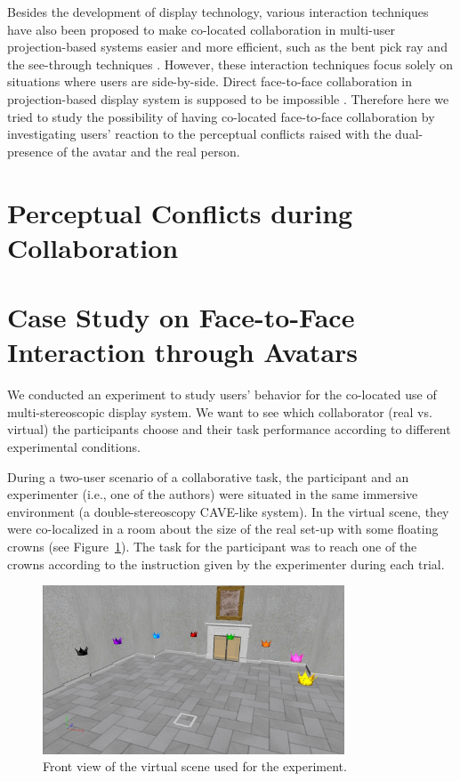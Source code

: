 Besides the development of display technology, various interaction techniques have also been proposed to make co-located collaboration in multi-user projection-based systems easier and more efficient, such as the bent pick ray \citep{Riege2006Bent} and the see-through techniques \citep{Argelaguet2010STT}. However, these interaction techniques focus solely on situations where users are side-by-side. Direct face-to-face collaboration in projection-based display system is supposed to be impossible \citep{Salzmann2009CIC}. Therefore here we tried to study the possibility of having co-located face-to-face collaboration by investigating users' reaction to the perceptual conflicts raised with the dual-presence of the avatar and the real person.


\section{Perceptual Conflicts during Collaboration}

\section{Case Study on Face-to-Face Interaction through Avatars}
We conducted an experiment to study users' behavior for the co-located use of multi-stereoscopic display system. We want to see which collaborator (real vs. virtual) the participants choose and their task performance according to different experimental conditions.

During a two-user scenario of a collaborative task, the participant and an experimenter (i.e., one of the authors) were situated in the same immersive environment (a double-stereoscopy CAVE-like system). In the virtual scene, they were co-localized in a room about the size of the real set-up with some floating crowns (see Figure~\ref{fig:2_virtual_room}). The task for the participant was to reach one of the crowns according to the instruction given by the experimenter during each trial.

\begin{figure}[tb]
  \centering
  \includegraphics[width=0.8\textwidth]{figures/2_virtual_room}
  \caption{\label{fig:2_virtual_room}Front view of the virtual scene used for the experiment.}
\end{figure}

